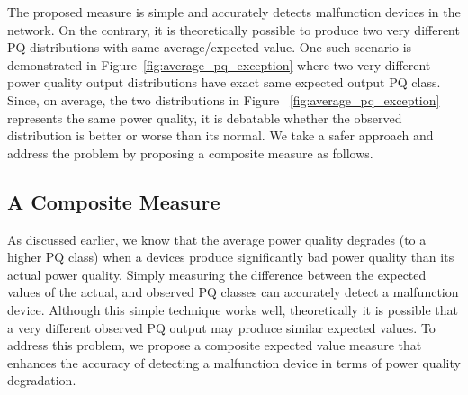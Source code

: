 The proposed measure is simple and accurately detects malfunction devices in the network. On the contrary, it is theoretically possible to produce two very different PQ distributions with same average/expected value. One such scenario is demonstrated in Figure~\ref{fig:average_pq_exception} where two very different power quality output distributions have exact same expected output PQ class. Since, on average, the two distributions in Figure ~\ref{fig:average_pq_exception} represents the same power quality, it is debatable whether the observed distribution is better or worse than its normal. We take a safer approach and address the problem by proposing a composite measure as follows.

\subsection{A Composite Measure}
As discussed earlier, we know that the average power quality degrades (to a higher PQ class) when a devices produce significantly bad power quality than its actual power quality. Simply measuring the difference between the expected values of the actual, and observed PQ classes can accurately detect a malfunction device. Although this simple technique works well, theoretically it is possible that a very different observed PQ output may produce similar expected values. To address this problem, we propose a composite expected value measure that enhances the accuracy of detecting a malfunction device in terms of power quality degradation.

